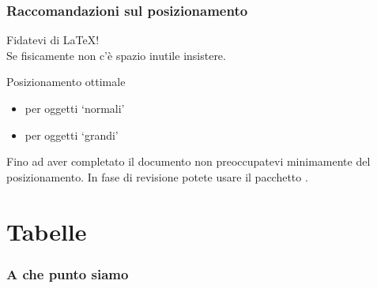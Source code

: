 \documentclass[svgnames,%
	ucs,%
	pdftex]{guitbeamer}
\begin{document}
\begin{frame}
  \frametitle{Raccomandazioni sul posizionamento}
	\begin{center}
		Fidatevi di \LaTeX!\\
		Se fisicamente non c'\`e spazio inutile insistere.
	\end{center}
  \medskip
	\begin{block}{Posizionamento ottimale}
		\begin{itemize}
			\item {} per oggetti `normali'
			\item {} per oggetti `grandi'
		\end{itemize}
	\end{block}
	Fino ad aver completato il documento non preoccupatevi minimamente del posizionamento. In fase di revisione potete usare il pacchetto .
\end{frame}
\section{Tabelle}
\begin{frame}
  \frametitle{A che punto siamo}
\end{frame}
\end{document}
